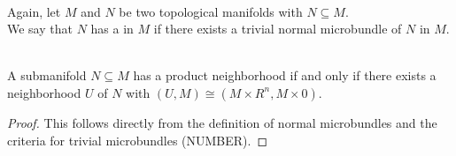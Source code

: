 \\ Again, let $M$ and $N$ be two topological manifolds with $N \subseteq M$.
\\ We say that $N$ has a  in $M$ if there exists a trivial normal microbundle of $N$ in $M$.

\\ A submanifold $N \subseteq M$ has a product neighborhood if and only if there exists a neighborhood $U$ of $N$ with $(U, M) \cong (M \times R^n, M \times 0)$.
\begin{proof}
This follows directly from the definition of normal microbundles and the criteria for trivial microbundles (NUMBER).
\end{proof}
